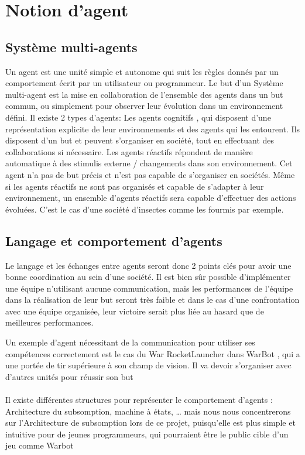 \documentclass{report}
\begin{document}
\section{Notion d'agent}
\subsection{Système multi-agents}
Un agent est une unité simple et autonome qui suit les règles donnés par un comportement  écrit par un utilisateur ou programmeur. 
Le but d’un Système multi-agent est la mise en collaboration de l’ensemble des agents dans un but commun, ou simplement pour observer leur évolution dans un environnement défini.
Il existe 2 types d’agents:
 Les agents cognitifs , qui disposent d’une représentation explicite de leur environnements et des agents qui les entourent. Ils disposent d’un but et peuvent s’organiser en société, tout en effectuant des collaborations si nécessaire.
Les agents réactifs répondent de manière automatique à des stimulis externe / changements dans son environnement. Cet agent n’a pas de but précis et n’est pas capable de s’organiser en sociétés. 
Même si les agents réactifs ne sont pas organisés et capable de s’adapter à leur environnement, un ensemble d’agents réactifs sera capable d’effectuer des actions évoluées. C’est le cas d’une société d’insectes comme les fourmis par exemple. 


\subsection{Langage et comportement d’agents}
 Le langage et les échanges entre agents seront donc 2 points clés pour avoir une bonne coordination au sein d’une société.
Il est bien sûr possible d’implémenter une équipe n’utilisant aucune communication, mais les performances de l’équipe dans la réalisation de leur but seront très faible et dans le cas d’une confrontation avec une équipe organisée, leur victoire serait plus liée au hasard que de meilleures performances.

Un exemple d’agent nécessitant de la communication pour utiliser ses compétences correctement est le cas du War RocketLauncher dans WarBot , qui a une portée de tir supérieure à son champ de vision. Il va devoir s’organiser avec d’autres unités pour réussir son but
\paragraph{}
Il existe différentes structures pour représenter le comportement d’agents : Architecture du subsomption, machine à états, … mais nous nous concentrerons sur l’Architecture de subsomption lors de ce projet, puisqu’elle est plus simple et intuitive pour de jeunes programmeurs, qui pourraient être le public cible d’un jeu comme Warbot
\end{document}
